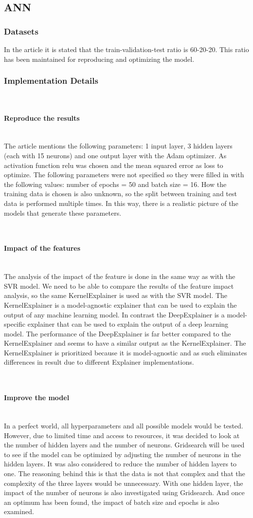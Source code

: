 \documentclass{article}
\newcommand{\subsubsubsection}[1]{%
  \paragraph{#1}\mbox{}\\}
\begin{document}
\subsection{ANN}

\subsubsection{Datasets}
In the article \cite{dahal2021prediction} it is stated that the train-validation-test ratio is 60-20-20. This ratio has been maintained for reproducing and optimizing the model.

\subsubsection{Implementation Details}

\subsubsubsection{Reproduce the results}
The article \cite{dahal2021prediction} mentions the following parameters: 1 input layer, 3 hidden layers (each with 15 neurons) and one output layer with the Adam optimizer.
As activation function relu was chosen and the mean squared error as loss to optimize. The following parameters were not specified so they were filled in with the following values: number of epochs = 50 and batch size = 16.
How the training data is chosen is also unknown, so the split between training and test data is performed multiple times. In this way, there is a realistic picture of the models that generate these parameters. 

\subsubsubsection{Impact of the features}
The analysis of the impact of the feature is done in the same way as with the SVR model.
We need to be able to compare the results of the feature impact analysis, so the same KernelExplainer is used as with the SVR model.
The KernelExplainer is a model-agnostic explainer that can be used to explain the output of any machine learning model.
In contrast the DeepExplainer is a model-specific explainer that can be used to explain the output of a deep learning model.
The performance of the DeepExplainer is far better compared to the KernelExplainer and seems to have a similar output as the KernelExplainer.
The KernelExplainer is prioritized because it is model-agnostic and as such eliminates differences in result due to different Explainer implementations.

\subsubsubsection{Improve the model}
In a perfect world, all hyperparameters and all possible models would be tested. However, due to limited time and access to resources, it was decided to look at the number of hidden layers and the number of neurons.
Gridsearch will be used to see if the model can be optimized by adjusting the number of neurons in the hidden layers.
It was also considered to reduce the number of hidden layers to one. The reasoning behind this is that the data is not that complex and that the complexity of the three layers would be unnecessary. With one hidden layer, the impact of the number of neurons is also investigated using Gridsearch. And once an optimum has been found, the impact of batch size and epochs is also examined.
\end{document}
